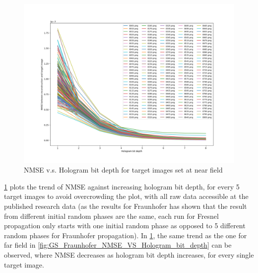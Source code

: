 	\begin{figure} [H]
	   \begin{center}
	   \includegraphics[trim={80 50 90 70}, clip, width = \textwidth]{GS_Fraunhofer_NMSE_VS_Hologram bit depth.png}
	   \end{center}
	   \caption{\label{fig:GS_Fresnel0.1_NMSE_VS_Hologram_bit_depth} NMSE v.s. Hologram bit depth for target images set at near field}
	\end{figure}

	\cref{fig:GS_Fresnel0.1_NMSE_VS_Hologram_bit_depth} plots the trend of NMSE against increasing hologram bit depth, for every 5 target images to avoid overcrowding the plot, with all raw data accessible at the published research data \cite{research_data_Sha2024} (as the results for Fraunhofer has shown that the result from different initial random phases are the same, each run for Fresnel propagation only starts with one initial random phase as opposed to 5 different random phases for Fraunhofer propagation). In \cref{fig:GS_Fresnel0.1_NMSE_VS_Hologram_bit_depth}, the same trend as the one for far field in \cref{fig:GS_Fraunhofer_NMSE_VS_Hologram_bit_depth} can be observed, where NMSE decreases as hologram bit depth increases, for every single target image.


